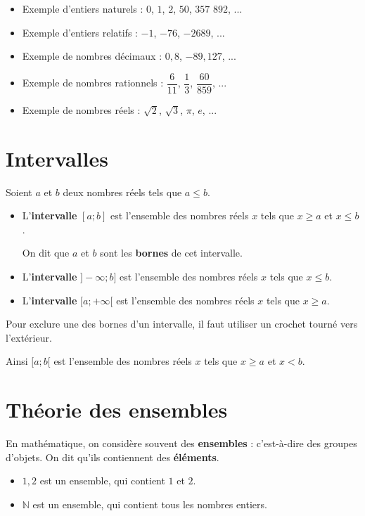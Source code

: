 \documentclass[classe=$2^{de}$]{coursclass}
\begin{document}
\begin{exemple}
	\begin{itemize}
		\item Exemple d'entiers naturels : $0$, $1$, $2$, $50$, $357$ $892$, ...
		\item Exemple d'entiers relatifs : $-1$, $-76$, $-2689$, ...
		\item Exemple de nombres décimaux : $0,8$, $-89,127$, ...
		\item Exemple de nombres rationnels : $\dfrac{6}{11}$, $\dfrac{1}{3}$, $\dfrac{60}{859}$, ...
		\item Exemple de nombres réels : $\sqrt{2}$, $\sqrt{3}$, $π$, $e$, ...
	\end{itemize}
\end{exemple}

\section{Intervalles}

\begin{definition}[Intervalle de $ℝ$]
	Soient $a$ et $b$ deux nombres réels tels que $a ≤ b$.
	\begin{itemize}
		\item L'\textbf{intervalle} $[a ; b]$ est l'ensemble des nombres réels $x$ tels que $x ≥ a$ et $x ≤ b$.

		      On dit que $a$ et $b$ sont les \textbf{bornes} de cet intervalle.
		\item L'\textbf{intervalle} $]-∞ ; b]$ est l'ensemble des nombres réels $x$ tels que $x ≤ b$.
		\item L'\textbf{intervalle} $[a ; +∞[$ est l'ensemble des nombres réels $x$ tels que $x ≥ a$.
	\end{itemize}

	Pour exclure une des bornes d'un intervalle, il faut utiliser un crochet tourné vers l'extérieur.

	Ainsi $[a ; b[$ est l'ensemble des nombres réels $x$ tels que $x ≥ a$ et $x < b$.
\end{definition}

\section{Théorie des ensembles}

En mathématique, on considère souvent des \textbf{ensembles} : c'est-à-dire des groupes d'objets. On dit qu'ils contiennent des \textbf{éléments}.

\begin{exemple}
	\begin{itemize}
		\item ${1, 2}$ est un ensemble, qui contient $1$ et $2$.
		\item $ℕ$ est un ensemble, qui contient tous les nombres entiers.
	\end{itemize}
\end{exemple}
\end{document}
